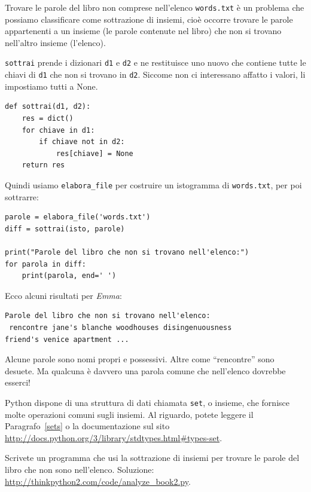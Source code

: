 \documentclass[10pt]{book}
\begin{document}
Trovare le parole del libro non comprese nell'elenco {\tt words.txt} è un problema che possiamo classificare come sottrazione di insiemi, cioè occorre trovare le parole appartenenti a un insieme (le parole contenute nel libro) che non si trovano nell'altro insieme (l'elenco).

{\tt sottrai} prende i dizionari {\tt d1} e {\tt d2} e ne restituisce uno nuovo che contiene tutte le chiavi di {\tt d1} che non si trovano in {\tt d2}.  Siccome non ci interessano affatto i valori, li impostiamo tutti a None.

\begin{verbatim}
def sottrai(d1, d2):
    res = dict()
    for chiave in d1:
        if chiave not in d2:
            res[chiave] = None
    return res
\end{verbatim}
%
Quindi usiamo \verb"elabora_file" per costruire un istogramma di
{\tt words.txt}, per poi sottrarre:

\begin{verbatim}
parole = elabora_file('words.txt')
diff = sottrai(isto, parole)

print("Parole del libro che non si trovano nell'elenco:")
for parola in diff:
    print(parola, end=' ')
\end{verbatim}
%
Ecco alcuni risultati per {\em Emma}:

\begin{verbatim}
Parole del libro che non si trovano nell'elenco:
 rencontre jane's blanche woodhouses disingenuousness 
friend's venice apartment ...
\end{verbatim}
%
Alcune parole sono nomi propri e possessivi. Altre come ``rencontre'' sono desuete. Ma qualcuna è davvero una parola comune che nell'elenco dovrebbe esserci!

\vspace{0.2in}
\begin{exercise}

Python dispone di una struttura di dati chiamata {\tt set}, o insieme, che fornisce molte operazioni comuni sugli insiemi. Al riguardo, potete leggere il Paragrafo~\ref{sets} o la documentazione sul sito  
\url{http://docs.python.org/3/library/stdtypes.html#types-set}. 

Scrivete un programma che usi la sottrazione di insiemi per trovare le parole del libro che non sono nell'elenco. Soluzione:
\url{http://thinkpython2.com/code/analyze_book2.py}.

\end{exercise}
\end{document}
